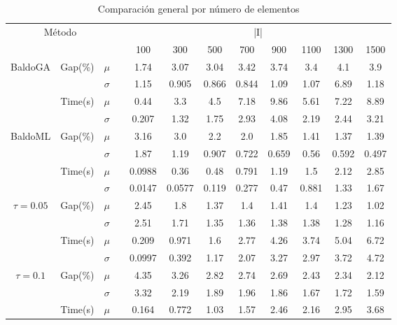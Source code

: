 \documentclass[spanish, a4paper, 12pt, openany,final]{book}
\begin{document}
\begin{table}[H]
	\caption{Comparación general por número de elementos}
	\label{tab:general_comparison}
	\begin{adjustbox}{width=\columnwidth,center}
		\begin{tabular}{cccccccccccc}
			\multicolumn{3}{c}{Método} & &\multicolumn{8}{c}{|I|}\\
			\cline{1-3} \cline{5-12}
			\multicolumn{3}{c}{} & & 100  & 300  & 500  & 700  & 900  & 1100 & 1300 & 1500\\
			\hline
			\multirow{4}{*}{BaldoGA} & \multirow{2}{*}{Gap(\%)} & $\mu$ & & 1.74 & 3.07 & 3.04 & 3.42 & 3.74 & 3.4 & 4.1 & 3.9 \\
			& & $\sigma$ & & 1.15 & 0.905 & 0.866 & 0.844 & 1.09 & 1.07 & 6.89 & 1.18 \\
			\cline{2-3}
			& \multirow{2}{*}{Time(s)} & $\mu$ & & 0.44 & 3.3 & 4.5 & 7.18 & 9.86 & 5.61 & 7.22 & 8.89 \\
			& & $\sigma$ & & 0.207 & 1.32 & 1.75 & 2.93 & 4.08 & 2.19 & 2.44 & 3.21 \\
			\hline		 	 
			\multirow{4}{*}{BaldoML} & \multirow{2}{*}{Gap(\%)} & $\mu$ & & 3.16 & 3.0 & 2.2 & 2.0 & 1.85 & 1.41 & 1.37 & 1.39 \\
			& & $\sigma$ & & 1.87 & 1.19 & 0.907 & 0.722 & 0.659 & 0.56 & 0.592 & 0.497 \\
			\cline{2-3}
			& \multirow{2}{*}{Time(s)} & $\mu$ & & 0.0988 & 0.36 & 0.48 & 0.791 & 1.19 & 1.5 & 2.12 & 2.85 \\
			& & $\sigma$ & & 0.0147 & 0.0577 & 0.119 & 0.277 & 0.47 & 0.881 & 1.33 & 1.67 \\
			\hline		 						 
			\multirow{4}{*}{$\tau=0.05$} & \multirow{2}{*}{Gap(\%)} & $\mu$ & & 2.45 & 1.8 & 1.37 & 1.4 & 1.41 & 1.4 & 1.23 & 1.02 \\
			& & $\sigma$ & & 2.51 & 1.71 & 1.35 & 1.36 & 1.38 & 1.38 & 1.28 & 1.16 \\
			\cline{2-3}
			& \multirow{2}{*}{Time(s)} & $\mu$ & & 0.209 & 0.971 & 1.6 & 2.77 & 4.26 & 3.74 & 5.04 & 6.72 \\
			& & $\sigma$ & & 0.0997 & 0.392 & 1.17 & 2.07 & 3.27 & 2.97 & 3.72 & 4.72 \\
			\hline		 						        
			\multirow{4}{*}{$\tau=0.1$} & \multirow{2}{*}{Gap(\%)} & $\mu$ & & 4.35 & 3.26 & 2.82 & 2.74 & 2.69 & 2.43 & 2.34 & 2.12 \\
			& & $\sigma$ & & 3.32 & 2.19 & 1.89 & 1.96 & 1.86 & 1.67 & 1.72 & 1.59 \\
			\cline{2-3}
			& \multirow{2}{*}{Time(s)} & $\mu$ & & 0.164 & 0.772 & 1.03 & 1.57 & 2.46 & 2.16 & 2.95 & 3.68 \\

\end{tabular}
\end{adjustbox}
\end{table}
\end{document}
